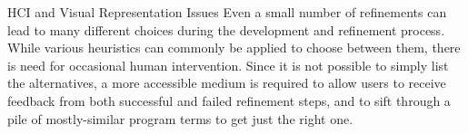 \begin{paragraph}{HCI and Visual Representation Issues}
Even a small number of refinements can lead to many different choices
during the development and refinement process.
While various heuristics can commonly be applied to choose between them,
there is need for occasional human intervention.
Since it is not possible to simply list the alternatives, a more accessible
medium is required to allow users to receive feedback from both successful
and failed refinement steps, and to sift through a pile of mostly-similar
program terms to get just the right one.
\end{paragraph}